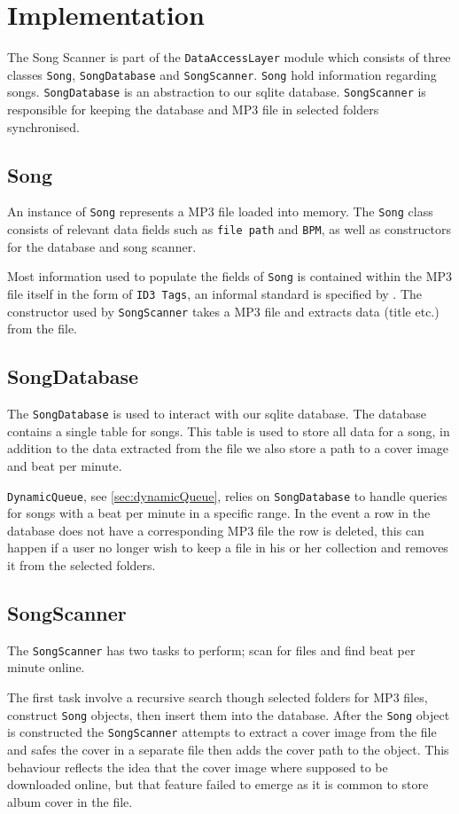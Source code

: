 \section{Implementation} %
The Song Scanner is part of the \texttt{DataAccessLayer} module which consists of three classes \texttt{Song}, \texttt{SongDatabase} and \texttt{SongScanner}. \texttt{Song} hold information regarding songs. \texttt{SongDatabase} is an abstraction to our sqlite database. \texttt{SongScanner} is responsible for keeping the database and MP3 file in selected folders synchronised.

\subsection{Song}
An instance of \texttt{Song} represents a MP3 file loaded into memory. The \texttt{Song} class consists of relevant data fields such as \texttt{file path} and \texttt{BPM}, as well as constructors for the database and song scanner. 

Most information used to populate the fields of \texttt{Song} is contained within the MP3 file itself in the form of \texttt{ID3 Tags}, an informal standard is specified by \citet{ID3:standard}. The constructor used by \texttt{SongScanner} takes a MP3 file and extracts data (title etc.) from the file.

\subsection{SongDatabase}
The \texttt{SongDatabase} is used to interact with our sqlite database. The database contains a single table for songs. This table is used to store all data for a song, in addition to the data extracted from the file we also store a path to a cover image and beat per minute.

\texttt{DynamicQueue}, see \cref{sec:dynamicQueue}, relies on \texttt{SongDatabase} to handle queries for songs with a beat per minute in a specific range. In the event a row in the database does not have a corresponding MP3 file the row is deleted, this can happen if a user no longer wish to keep a file in his or her collection and removes it from the selected folders. 

\subsection{SongScanner} 
The \texttt{SongScanner} has two tasks to perform; scan for files and find beat per minute online.

The first task involve a recursive search though selected folders for MP3 files, construct \texttt{Song} objects, then insert them into the database. After the \texttt{Song} object is constructed the \texttt{SongScanner} attempts to extract a cover image from the file and safes the cover in a separate file then adds the cover path to the object. This behaviour reflects the idea that the cover image where supposed to be downloaded online, but that feature failed to emerge as it is common to store album cover in the file. 



